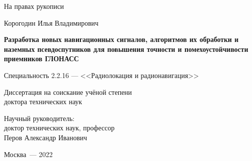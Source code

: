 \begin{titlepage}
\vspace{-10ex}

    \thispagestyle{empty}

    \vspace{-3ex}

    \begin{centering}

        \vspace{1cm}

        \begin{flushright}
        	На правах рукописи
        \end{flushright}

        \vspace{2cm}
        
        {\large
		Корогодин Илья Владимирович
		}
        \vspace{1.5cm}

        {\large
		\textbf{
		 Разработка новых навигационных сигналов, алгоритмов их обработки и наземных псевдоспутников для повышения точности и помехоустойчивости приемников ГЛОНАСС
		}
		}

        \vspace{1cm}
		Специальность 2.2.16 --- <<Радиолокация и радионавигация>>
 
        \vspace{1cm}
        Диссертация на соискание учёной степени\\ доктора технических наук

        \vspace{1.5cm}
        \begin{flushright}
        	Научный руководитель:\\
        	доктор технических наук, профессор\\
        	Перов Александр Иванович
        \end{flushright}
        
        \vspace{1cm}
		\vfill
     	Москва~--- 2022
        
    \end{centering}
\end{titlepage}